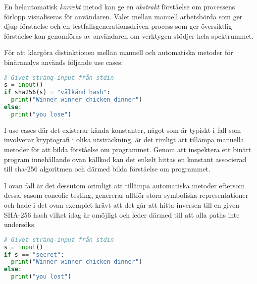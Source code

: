 
En helautomatisk \textit{korrekt} metod kan ge en \textit{abstrakt} förståelse
om processens förlopp visualiseras för användaren. Valet mellan manuell
arbetsbörda som ger djup förståelse och en testfallsgenerationsdriven process
som ger översiktlig förståelse kan genomföras av användaren om verktygen stödjer
hela spektrummet.

För att klargöra distinktionen mellan manuell och automatiska metoder för
binäranalys används följande use cases:

\begin{lstlisting}[label={list:first}, language=Python, caption=Use case
manuella metoder]
# Givet sträng-input från stdin
s = input()
if sha256(s) = "välkänd hash":
  print("Winner winner chicken dinner")
else:
  print("you lose")

\end{lstlisting}

I use cases där det existerar kända konstanter, något som är typiskt i fall som
involverar kryptografi i olika utsträckning, är det rimligt att tillämpa
manuella metoder för att bilda förståelse om programmet. Genom att inspektera
ett binärt program innehållande ovan källkod kan det enkelt hittas en konstant
associerad till sha-256 algoritmen och därmed bilda förståelse om programmet.

I ovan fall är det dessutom orimligt att tillämpa automatiska metoder eftersom
dessa, såsom concolic testing, genererar alltför stora symboliska
representationer och hade i det ovan exemplet krävt att det går att hitta
inversen till en given SHA-256 hash vilket idag är omöjligt och leder därmed
till att alla paths inte undersöks.

\begin{lstlisting}[label={list:first}, language=Python, caption=Use case
manuella metoder]
# Givet sträng-input från stdin
s = input()
if s == "secret":
  print("Winner winner chicken dinner")
else:
  print("you lost")
\end{lstlisting}

